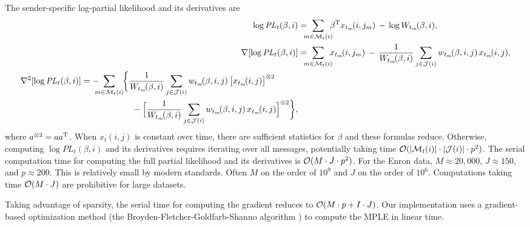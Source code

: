\documentclass[aoas,preprint]{imsart}
\begin{document}
The sender-specific log-partial likelihood and its derivatives are
\begin{align*}
    \log \mathit{PL}_t(\beta, i)
        &=
        \!\!\!\!
        \sum_{m \in \mathcal{M}_t(i)}
            \!\!\!
            \beta^\trans        
            x_{t_m}\!(i, j_m)
            \,
            -
            \,
            \log W_{t_m}\!(\beta, i), \\
    \nabla [ \log \mathit{PL}_t(\beta, i) ]
        &=
        \!\!\!\!        
        \sum_{m \in \mathcal{M}_t(i)}
            \!\!\!
            x_{t_m}\!(i,j_m)
            \,
            -
            \,
            \frac{1}{W_{t_m}\!(\beta,i)}
                \sum_{j \in \mathcal{J}(i)}
                    w_{t_m}\!(\beta,i,j) \,
                    x_{t_m}\!(i,j), \\
    \begin{split}
    \nabla^2 [ \log \mathit{PL}_t(\beta, i) ]
        &=
        -
        \!\!\!\!
        \sum_{m \in \mathcal{M}_t(i)}
            \!\!
            \bigg\{
            \frac{1}{W_{t_m}\!(\beta,i)}
            \sum_{j \in \mathcal{J}(i)}
                w_{t_m}\!(\beta,i,j) \,
                \big[
                    x_{t_m}\!(i,j)
                \big]^{\otimes 2} \\
        &\qquad\qquad\qquad-
            \Big[
                \frac{1}{W_{t_m}\!(\beta,i)}
                \sum_{j \in \mathcal{J}(i)}
                    w_{t_m}\!(\beta,i,j) \,
                    x_{t_m}\!(i,j)
            \Big]^{\otimes 2}
            \bigg\},
    \end{split}
\end{align*}
where $a^{\otimes 2} = a a^{\mathrm{T}}$.  When $x_t(i,j)$ is constant over time,
there are sufficient statistics for $\beta$ and these formulas reduce.
Otherwise, computing $\log \mathit{PL}_t(\beta,i)$ and its derivatives
requires iterating over all messages, potentially taking time
$\mathcal{O}(|\mathcal{M}_t(i)| \cdot |\mathcal{J}(i)| \cdot p^2)$.  
The serial computation time for computing the full partial likelihood
and its derivatives is $\mathcal{O}(M \cdot J \cdot p^2)$.
For the Enron data, $M \approx 20,\!000$, $J \approx 150$,
and $p \approx 200$.  This is relatively small by modern standards.  Often
$M$ on the order of $10^9$ and $J$ on the order of $10^6$.  Computations
taking time $\mathcal{O}(M \cdot J)$ are prohibitive for large datasets.

Taking advantage of sparsity, the serial time for computing the
gradient reduces to $\mathcal{O}(M \cdot p + I \cdot J)$.   Our implementation
uses a gradient-based optimization method (the
Broyden-Fletcher-Goldfarb-Shanno algorithm \cite{nocedal2006numerical}) to
compute the MPLE in linear time.
\end{document}
